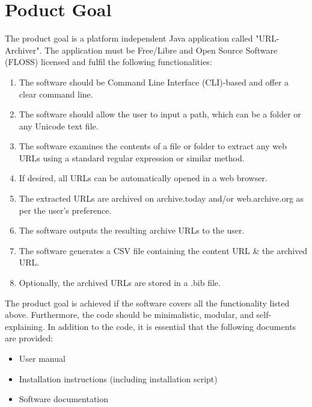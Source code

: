 \section{Poduct Goal}
The product goal is a platform independent Java application called "URL-Archiver".
The application must be Free/Libre and Open Source Software (FLOSS) licensed and fulfil the following functionalities:
\begin{enumerate}
    \item The software should be Command Line Interface (CLI)-based and offer a clear command line.
    \item The software should allow the user to input a path, which can be a folder or any Unicode text file.
    \item The software examines the contents of a file or folder to extract any web URLs using a standard regular expression or similar method.
    \item If desired, all URLs can be automatically opened in a web browser.
    \item The extracted URLs are archived on archive.today and/or web.archive.org as per the user's preference.
    \item The software outputs the resulting archive URLs to the user.
    \item The software generates a CSV file containing the content URL & the archived URL.
    \item Optionally, the archived URLs are stored in a .bib file.
\end{enumerate}
The product goal is achieved if the software covers all the functionality listed above.
Furthermore, the code should be minimalistic, modular, and self-explaining.
In addition to the code, it is essential that the following documents are provided:
\begin{itemize}
    \item User manual
    \item Installation instructions (including installation script)
    \item Software documentation
\end{itemize}



